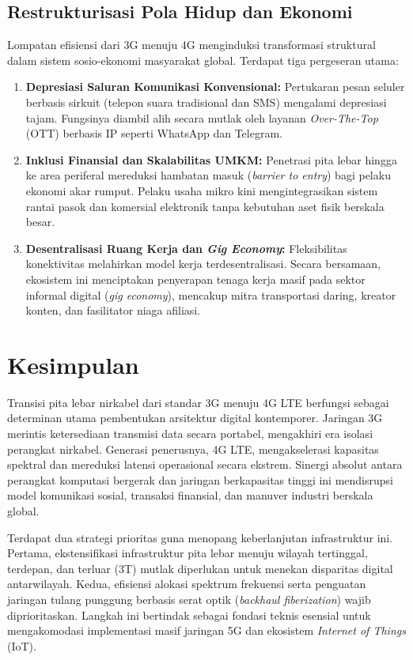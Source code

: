 \documentclass[12pt,a4paper]{article}
\begin{document}
\subsection{Restrukturisasi Pola Hidup dan Ekonomi}
Lompatan efisiensi dari 3G menuju 4G menginduksi transformasi struktural dalam sistem sosio-ekonomi masyarakat global. Terdapat tiga pergeseran utama:
\begin{enumerate}
\item \textbf{Depresiasi Saluran Komunikasi Konvensional:} Pertukaran pesan seluler berbasis sirkuit (telepon suara tradisional dan SMS) mengalami depresiasi tajam. Fungsinya diambil alih secara mutlak oleh layanan \textit{Over-The-Top} (OTT) berbasis IP seperti WhatsApp dan Telegram.
\item \textbf{Inklusi Finansial dan Skalabilitas UMKM:} Penetrasi pita lebar hingga ke area periferal mereduksi hambatan masuk (\textit{barrier to entry}) bagi pelaku ekonomi akar rumput. Pelaku usaha mikro kini mengintegrasikan sistem rantai pasok dan komersial elektronik tanpa kebutuhan aset fisik berskala besar.
\item \textbf{Desentralisasi Ruang Kerja dan \textit{Gig Economy}:} Fleksibilitas konektivitas melahirkan model kerja terdesentralisasi. Secara bersamaan, ekosistem ini menciptakan penyerapan tenaga kerja masif pada sektor informal digital (\textit{gig economy}), mencakup mitra transportasi daring, kreator konten, dan fasilitator niaga afiliasi.
\end{enumerate}

\newpage

\section{Kesimpulan}

Transisi pita lebar nirkabel dari standar 3G menuju 4G LTE berfungsi sebagai determinan utama pembentukan arsitektur digital kontemporer. Jaringan 3G merintis ketersediaan transmisi data secara portabel, mengakhiri era isolasi perangkat nirkabel. Generasi penerusnya, 4G LTE, mengakselerasi kapasitas spektral dan mereduksi latensi operasional secara ekstrem. Sinergi absolut antara perangkat komputasi bergerak dan jaringan berkapasitas tinggi ini mendisrupsi model komunikasi sosial, transaksi finansial, dan manuver industri berskala global.

Terdapat dua strategi prioritas guna menopang keberlanjutan infrastruktur ini. Pertama, ekstensifikasi infrastruktur pita lebar menuju wilayah tertinggal, terdepan, dan terluar (3T) mutlak diperlukan untuk menekan disparitas digital antarwilayah. Kedua, efisiensi alokasi spektrum frekuensi serta penguatan jaringan tulang punggung berbasis serat optik (\textit{backhaul fiberization}) wajib diprioritaskan. Langkah ini bertindak sebagai fondasi teknis esensial untuk mengakomodasi implementasi masif jaringan 5G dan ekosistem \textit{Internet of Things} (IoT).
\end{document}
